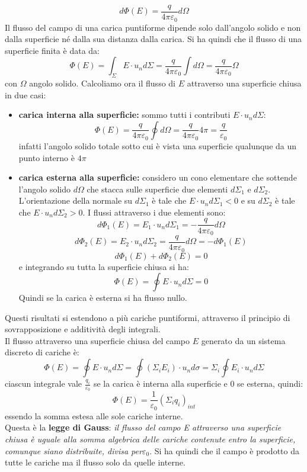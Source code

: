 \documentclass[a4paper,12pt, oneside]{book}
\begin{document}
$$d\Phi(E)=\frac{q}{4\pi\varepsilon_0}d\Omega$$
Il flusso del campo di una carica puntiforme dipende solo dall'angolo solido e non dalla superficie né dalla sua distanza dalla carica. Si ha quindi che il flusso di una superficie finita è data da:
$$\Phi(E)=\int_\Sigma E\cdot u_nd\Sigma=\frac{q}{4\pi\varepsilon_0}\int d\Omega=\frac{q}{4\pi\varepsilon_0}\Omega$$
con $\Omega$ angolo solido. Calcoliamo ora il flusso di $E$ attraverso una superficie chiusa in due casi:
\begin{itemize}
	\item \textbf{carica interna alla superficie:} sommo tutti i contributi $E\cdot u_nd\Sigma$:
	      $$\Phi(E)=\frac{q}{4\pi\varepsilon_0}\oint d\Omega=\frac{q}{4\pi\varepsilon_0}4\pi=\frac{q}{\varepsilon_0}$$
	      infatti l'angolo solido totale sotto cui è vista una superficie qualunque da un punto interno è $4\pi$
	\item \textbf{carica esterna alla superficie:} considero un cono elementare che sottende l'angolo solido $d\Omega$ che stacca sulle superficie due elementi $d\Sigma_1$ e $d\Sigma_2$. L'orientazione della normale su $d\Sigma_1$ è tale che $E\cdot u_nd\Sigma_1<0$ e su $d\Sigma_2$ è tale che $E\cdot u_nd\Sigma_2>0$. I flussi attraverso i due elementi sono:
	      $$d\Phi_1(E)=E_1\cdot u_nd\Sigma_1=-\frac{q}{4\pi\varepsilon_0}d\Omega$$
	      $$d\Phi_2(E)=E_2\cdot u_nd\Sigma_2=\frac{q}{4\pi\varepsilon_0}d\Omega=-d\Phi_1(E)$$
	      $$d\Phi_1(E)+d\Phi_2(E)=0$$
	      e integrando su tutta la superficie chiusa si ha:
	      $$\Phi(E)=\oint E\cdot u_nd\Sigma=0$$
	      Quindi se la carica è esterna si ha flusso nullo.\\
\end{itemize}
Questi risultati si estendono a più cariche puntiformi, attraverso il principio di sovrapposizione e additività degli integrali.\\
Il flusso attraverso una superficie chiusa del campo $E$ generato da un sistema discreto di cariche è:
$$\Phi(E)=\oint E\cdot u_nd\Sigma=\oint (\Sigma_iE_i)\cdot u_nd\sigma=\Sigma_i\oint E_i\cdot u_nd\Sigma$$
ciascun integrale vale $\frac{q_i}{\varepsilon_0}$ se la carica è interna alla superficie e 0 se esterna, quindi:
$$\Phi(E)=\frac{1}{\varepsilon_0}(\Sigma_iq_i)_{int}$$
essendo la somma estesa alle sole cariche interne.\\
Questa è la \textbf{legge di Gauss}: \textit{il flusso del campo E attraverso una superficie chiusa è uguale alla somma algebrica delle cariche contenute entro la superficie, comunque siano distribuite, divisa per}$\varepsilon_0$. Si ha quindi che il campo è prodotto da tutte le cariche ma il flusso solo da quelle interne.\\
\end{document}
